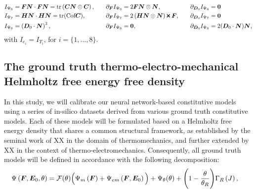 %
\begin{equation}\label{eqn:TI 2}
\begin{aligned}	
%
&I_{\Psi_6}=\vect{F}\vect{N}\cdot\vect{F}\vect{N}=\text{tr}\left(\vect{C}\vect{N}\otimes\vect{C}\right),&\quad &\partial_{\vect{F}}I_{\Psi_6}=2\vect{F}\vect{N}\otimes\vect{N},&\quad &\partial_{\vect{D}_0}I_{\Psi_6}=\vect{0}\\
%
%
&I_{\Psi_7}=\vect{H}\vect{N}\cdot\vect{H}\vect{N}=\text{tr}(\text{Cof}\vect{C})
%
%
,&\quad   
&\partial_{\vect{F}}I_{\Psi_7}=2\left(\vect{H}\vect{N}\otimes\vect{N}\right)\Cross \vect{F},&\quad &\partial_{\vect{D}_0}I_{\Psi_7}=\vect{0}\\
%
%
&I_{\Psi_8}=\left(\vect{D}_0\cdot\vect{N}\right)^2
%
%
,&\quad   
&\partial_{\vect{F}}I_{\Psi_8}=\vect{0},&\quad &\partial_{\vect{D}_0}I_{\Psi_8}=2(\vect{D}_0\cdot \vect{N})\vect{N},
%
\end{aligned}
\end{equation}
%
with $I_{e_i}=I_{\Upsilon_i}$, for $i=\{1,\dots,8\}$.


\subsection{The ground truth thermo-electro-mechanical Helmholtz free energy free density}\label{sec:ground truth model}

In this study, we will calibrate our neural network-based constitutive models using a series of in-silico datasets derived from various ground truth constitutive models. Each of these models will be formulated based on a Helmholtz free energy density that shares a common structural framework, as established by the seminal work of XX in the domain of thermomechanics, and further extended by XX in the context of thermo-electromechanics. Consequently, all ground truth models will be defined in accordance with the following decomposition:
%
\begin{equation}\label{eqn:additive decomposition}
\begin{aligned}
\Psi\left(\boldsymbol{F},\boldsymbol{E}_0,\theta\right)& = \mathcal{F}(\theta)\Big({\Psi}_{m}\left(\boldsymbol{F}\right)+{\Psi}_{em}\left(\boldsymbol{F},\boldsymbol{E}_0\right)\Big) + {\Psi}_{\theta}(\theta)+\Bigg(1 - \frac{\theta}{\theta_R}\Bigg)\Gamma_R\left(J\right),
\end{aligned}
\end{equation}

